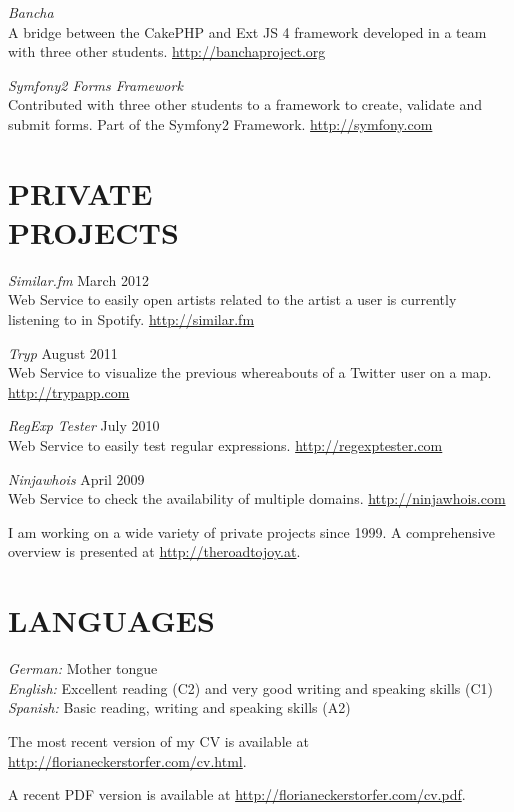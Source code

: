 \documentclass[margin]{res}
\begin{document}
\begin{resume}
{\sl Bancha} \\
	A bridge between the CakePHP and Ext JS 4 framework developed in a team with three other students. \url{http://banchaproject.org}

{\sl Symfony2 Forms Framework} \\
	Contributed with three other students to a framework to create, validate and submit forms. Part of the Symfony2 Framework. \url{http://symfony.com}

\section{PRIVATE \\ PROJECTS}

{\sl Similar.fm} \hfill March 2012 \\
	Web Service to easily open artists related to the artist a user is currently listening to in Spotify. \url{http://similar.fm}

{\sl Tryp} \hfill August 2011 \\
	Web Service to visualize the previous whereabouts of a Twitter user on a map. \\ \url{http://trypapp.com}

{\sl RegExp Tester} \hfill July 2010 \\
	Web Service to easily test regular expressions. \url{http://regexptester.com}

{\sl Ninjawhois} \hfill April 2009 \\
	Web Service to check the availability of multiple domains. \url{http://ninjawhois.com}

I am working on a wide variety of private projects since 1999. A comprehensive overview is presented at \url{http://theroadtojoy.at}.


\section{LANGUAGES}

{\sl German:} Mother tongue \\
{\sl English:} Excellent reading (C2) and very good writing and speaking skills (C1) \\
{\sl Spanish:} Basic reading, writing and speaking skills (A2)


\end{resume}

\vspace{15 mm}

The most recent version of my CV is available at \url{http://florianeckerstorfer.com/cv.html}.

A recent PDF version is available at \url{http://florianeckerstorfer.com/cv.pdf}.
\end{document}
